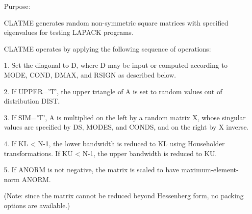 \begin{DoxyParagraph}{Purpose\+: }
\begin{DoxyVerb}    CLATME generates random non-symmetric square matrices with
    specified eigenvalues for testing LAPACK programs.

    CLATME operates by applying the following sequence of
    operations:

    1. Set the diagonal to D, where D may be input or
         computed according to MODE, COND, DMAX, and RSIGN
         as described below.

    2. If UPPER='T', the upper triangle of A is set to random values
         out of distribution DIST.

    3. If SIM='T', A is multiplied on the left by a random matrix
         X, whose singular values are specified by DS, MODES, and
         CONDS, and on the right by X inverse.

    4. If KL < N-1, the lower bandwidth is reduced to KL using
         Householder transformations.  If KU < N-1, the upper
         bandwidth is reduced to KU.

    5. If ANORM is not negative, the matrix is scaled to have
         maximum-element-norm ANORM.

    (Note: since the matrix cannot be reduced beyond Hessenberg form,
     no packing options are available.)\end{DoxyVerb}
 
\end{DoxyParagraph}

